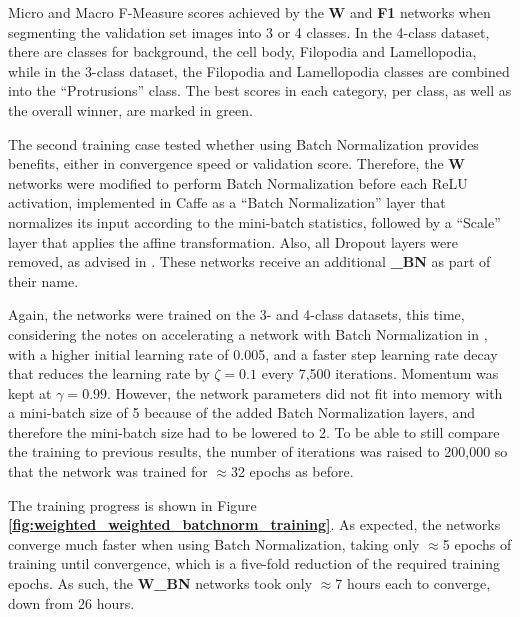 \begin {table}
\caption[Micro and Macro F-Measure scores for networks with weighted Cross-Entropy and F-Measure loss functions.]{Micro and Macro F-Measure scores achieved by the \textbf{W} and \textbf{F1} networks when segmenting the validation set images into 3 or 4 classes. In the 4-class dataset, there are classes for background, the cell body, Filopodia and Lamellopodia, while in the 3-class dataset, the Filopodia and Lamellopodia classes are combined into the ``Protrusions'' class. The best scores in each category, per class, as well as the overall winner, are marked in green.}
\label{tab:results1}
\end {table}



\noindent The second training case tested whether using Batch Normalization provides benefits, either in convergence speed or validation score. Therefore, the \textbf{W} networks were modified to perform Batch Normalization before each ReLU activation, implemented in Caffe as a ``Batch Normalization'' layer that normalizes its input according to the mini-batch statistics, followed by a ``Scale'' layer that applies the affine transformation. Also, all Dropout layers were removed, as advised in \cite{batchnorm}. These networks receive an additional \textbf{\_BN} as part of their name.

Again, the networks were trained on the 3- and 4-class datasets, this time, considering the notes on accelerating a network with Batch Normalization in \cite{batchnorm}, with a higher initial learning rate of 0.005, and a faster step learning rate decay that reduces the learning rate by $\zeta = 0.1$ every 7,500 iterations. Momentum was kept at $\gamma = 0.99$. However, the network parameters did not fit into memory with a mini-batch size of 5 because of the added Batch Normalization layers, and therefore the mini-batch size had to be lowered to 2. To be able to still compare the training to previous results, the number of iterations was raised to 200,000 so that the network was trained for $\approx$32 epochs as before.

The training progress is shown in Figure \textbf{\ref{fig:weighted_weighted_batchnorm_training}}. As expected, the networks converge much faster when using Batch Normalization, taking only $\approx$5 epochs of training until convergence, which is a five-fold reduction of the required training epochs. As such, the \textbf{W\_BN} networks took only $\approx$7 hours each to converge, down from 26 hours.\\



